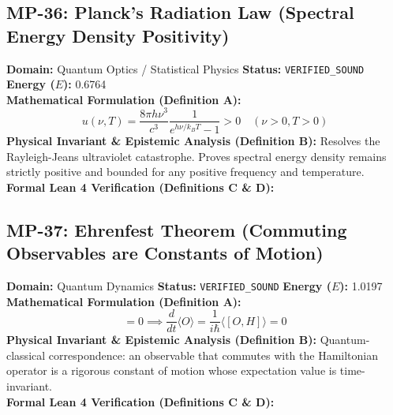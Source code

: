 \subsection{MP-36: Planck's Radiation Law (Spectral Energy Density Positivity)}
\textbf{Domain:} Quantum Optics / Statistical Physics \hfill \textbf{Status:} \texttt{VERIFIED\_SOUND} \hfill \textbf{Energy ($E$):} 0.6764\\
\textbf{Mathematical Formulation (Definition A):}
\begin{equation*}
u(\nu, T) = \frac{8\pi h \nu^3}{c^3} \frac{1}{e^{h\nu/k_B T} - 1} > 0 \quad (\nu > 0, T > 0)
\end{equation*}
\textbf{Physical Invariant \& Epistemic Analysis (Definition B):}
Resolves the Rayleigh-Jeans ultraviolet catastrophe. Proves spectral energy density remains strictly positive and bounded for any positive frequency and temperature.\\

\textbf{Formal Lean 4 Verification (Definitions C \& D):}


\vspace{1em}
\subsection{MP-37: Ehrenfest Theorem (Commuting Observables are Constants of Motion)}
\textbf{Domain:} Quantum Dynamics \hfill \textbf{Status:} \texttt{VERIFIED\_SOUND} \hfill \textbf{Energy ($E$):} 1.0197\\
\textbf{Mathematical Formulation (Definition A):}
\begin{equation*}
[H, O] = 0 \implies \frac{d}{dt}\langle O \rangle = \frac{1}{i\hbar}\langle [O, H] \rangle = 0
\end{equation*}
\textbf{Physical Invariant \& Epistemic Analysis (Definition B):}
Quantum-classical correspondence: an observable that commutes with the Hamiltonian operator is a rigorous constant of motion whose expectation value is time-invariant.\\

\textbf{Formal Lean 4 Verification (Definitions C \& D):}


\vspace{1em}
